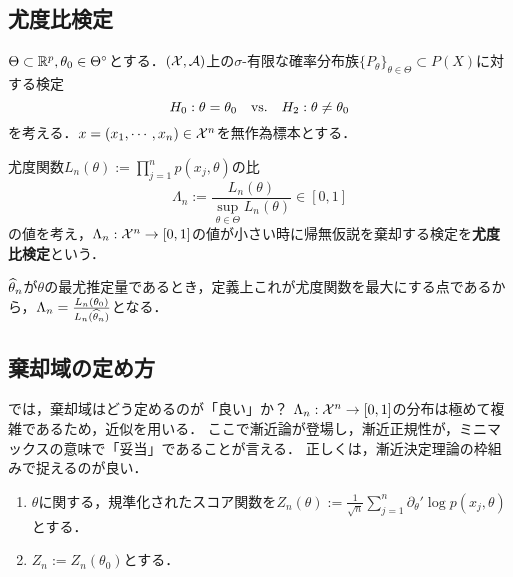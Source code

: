 \documentclass[uplatex,dvipdfmx]{jsreport}
\begin{document}
\subsection{尤度比検定}

\begin{notation}
    $\Theta\subset\mathbb{R}^p,\theta_0\in\Theta^\circ$とする．$(\mathcal{X},\mathcal{A})$上の$\sigma$-有限な確率分布族$\{P_\theta\}_{\theta\in\Theta}\subset P(X)$に対する検定
    \[H_0:\theta=\theta_0\quad\mathrm{vs.}\quad H_2:\theta\ne\theta_0\]
    を考える．$x=(x_1,\cdots,x_n)\in\mathcal{X}^n$を無作為標本とする．
\end{notation}

\begin{definition}
    尤度関数$L_n(\theta):=\prod^n_{j=1}p(x_j,\theta)$の比
    \[\Lambda_n:=\frac{L_n(\theta)}{\sup_{\theta\in\Theta}L_n(\theta)}\in[0,1]\]
    の値を考え，$\Lambda_n:\mathcal{X}^n\to[0,1]$の値が小さい時に帰無仮説を棄却する検定を\textbf{尤度比検定}という．
\end{definition}
\begin{remark}
    $\widehat{\theta}_n$が$\theta$の最尤推定量であるとき，定義上これが尤度関数を最大にする点であるから，$\Lambda_n=\frac{L_n(\theta_0)}{L_n(\widehat{\theta}_n)}$となる．
\end{remark}

\subsection{棄却域の定め方}

\begin{tcolorbox}[colframe=ForestGreen, colback=ForestGreen!10!white,breakable,colbacktitle=ForestGreen!40!white,coltitle=black,fonttitle=\bfseries\sffamily,
title=]
    では，棄却域はどう定めるのが「良い」か？
    $\Lambda_n:\mathcal{X}^n\to[0,1]$の分布は極めて複雑であるため，近似を用いる．
    ここで漸近論が登場し，漸近正規性が，ミニマックスの意味で「妥当」であることが言える．
    正しくは，漸近決定理論の枠組みで捉えるのが良い．
\end{tcolorbox}

\begin{definition}\mbox{}
    \begin{enumerate}
        \item $\theta$に関する，規準化されたスコア関数を$Z_n(\theta):=\frac{1}{\sqrt{n}}\sum^n_{j=1}\partial_\theta'\log p(x_j,\theta)$とする．
        \item $Z_n:=Z_n(\theta_0)$とする．
    \end{enumerate}
\end{definition}
\end{document}
